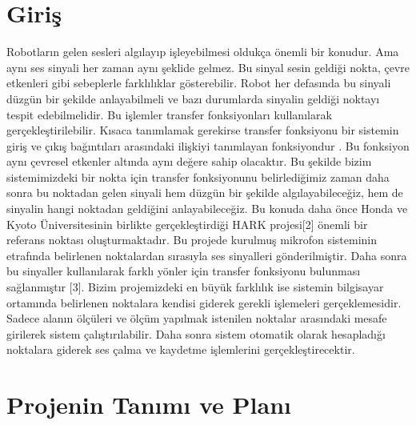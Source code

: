 \documentclass[a4paper, 12pt, titlepage]{article}
\begin{document}
\newpage
\tableofcontents
\newpage

\section{Giriş}
Robotların gelen sesleri algılayıp işleyebilmesi oldukça önemli bir konudur. Ama aynı ses sinyali her zaman aynı şeklide gelmez. Bu sinyal sesin geldiği nokta, çevre etkenleri gibi sebeplerle farklılıklar gösterebilir. Robot her defasında bu sinyali düzgün bir şekilde anlayabilmeli ve bazı durumlarda sinyalin geldiği noktayı tespit edebilmelidir. Bu işlemler transfer fonksiyonları kullanılarak gerçekleştirilebilir.
Kısaca tanımlamak gerekirse transfer fonksiyonu bir sistemin giriş ve çıkış bağıntıları arasındaki ilişkiyi tanımlayan fonksiyondur \cite {transfer function}. Bu fonksiyon aynı çevresel etkenler altında aynı değere sahip olacaktır. Bu şekilde bizim sistemimizdeki bir nokta için transfer fonksiyonunu belirlediğimiz zaman daha sonra bu noktadan gelen sinyali hem düzgün bir şekilde algılayabileceğiz, hem de sinyalin hangi noktadan geldiğini anlayabileceğiz.
Bu konuda daha önce Honda ve Kyoto Üniversitesinin birlikte gerçekleştirdiği HARK projesi[2] önemli bir referans noktası oluşturmaktadır. Bu projede kurulmuş mikrofon sisteminin etrafında belirlenen noktalardan sırasıyla ses sinyalleri gönderilmiştir. Daha sonra bu sinyaller kullanılarak farklı yönler için transfer fonksiyonu bulunması sağlanmıştır [3].
Bizim projemizdeki en büyük farklılık ise sistemin bilgisayar ortamında belirlenen noktalara kendisi giderek gerekli işlemeleri gerçeklemesidir. Sadece alanın ölçüleri ve ölçüm yapılmak istenilen noktalar arasındaki mesafe girilerek sistem çalıştırılabilir. Daha sonra sistem otomatik olarak hesapladığı noktalara giderek ses çalma ve kaydetme işlemlerini gerçekleştirecektir.
\newpage
\section{Projenin Tanımı ve Planı}
\end{document}
